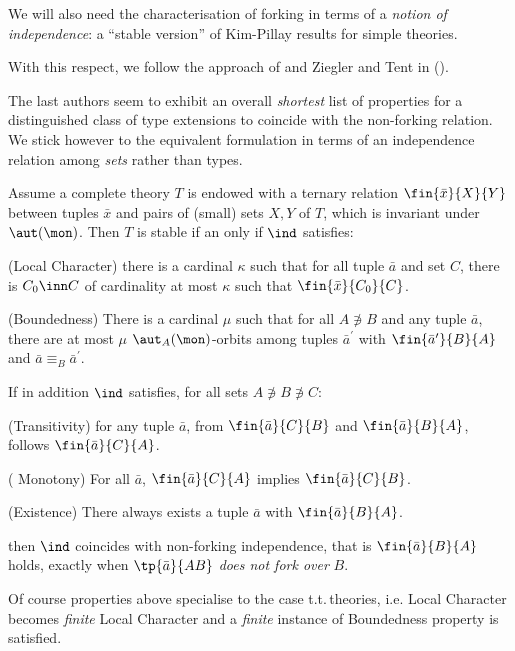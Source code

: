 \medskip
We will also need the characterisation of forking in terms of a {\em notion of independence}:
a ``stable version'' of Kim-Pillay results for simple theories.

With this respect, we follow the approach of \cite[Theorem 5.8]{haha} and Ziegler and Tent in (\cite[Theorem 36.10]{zietent}).

The last authors seem to exhibit an overall {\em shortest} list of properties for a distinguished class of type extensions to
coincide with the non-forking relation. We stick however to the equivalent formulation in terms of an independence relation
among {\em sets} rather than types.
\begin{fact}\label{stableforking}
Assume a complete theory $T$ is endowed with a ternary relation $\fin{\bar x}{X}{Y}$ between tuples $\bar x$ and pairs of
(small) sets $X,Y$ of $T$,
which is invariant under $\aut(\mon)$.
Then $T$ is stable if an only if $\ind$ satisfies:
\begin{description}
\item{\small{\sc (Local Character)}} there is a cardinal $\kappa$ such that for all tuple $\bar a$ and set $C$, there is $C_{0}\inn C$ of
cardinality at most $\kappa$ such that $\fin{\bar x}{C_{0}}{C}$.
\item{\small{\sc (Boundedness)}} There is a cardinal $\mu$ such that for all $A\nni B$ and any tuple $\bar a$, there are at most
$\mu$ $\aut_{A}(\mon)$-orbits among tuples $\bar a^{\prime}$ with $\fin{\bar a^{\prime}}{B}{A}$ and $\bar a\equiv_{B}\bar a^{\prime}$.
\end{description}
\smallskip
If in addition $\ind$ satisfies, for all sets $A\nni B\nni C$:
\begin{description}
\item{\small\sc(Transitivity)} for any tuple $\bar a$, %
from $\fin{\bar a}{C}{B}$ and $\fin{\bar a}{B}{A}$, follows $\fin{\bar a}{C}{A}$.
\item{\small\sc(%
Monotony)} For all %
$\bar a$, $\fin{\bar a}{C}{A}$ implies $\fin{\bar a}{C}{B}$.
\item{\small\sc(Existence)} %
There always exists a tuple $\bar a$ with $\fin{\bar a}{B}{A}$.
\end{description}
then $\ind$ coincides with non-forking independence,
that is $\fin{\bar a}{B}{A}$ holds, exactly when $\tp{\bar a}{AB}$ {\em does not fork over} $B$.
\end{fact}
Of course properties above specialise to the case t.t.\,theories, i.{}e. Local Character becomes
{\em finite} Local Character and a {\em finite} instance of Boundedness property is satisfied. 

